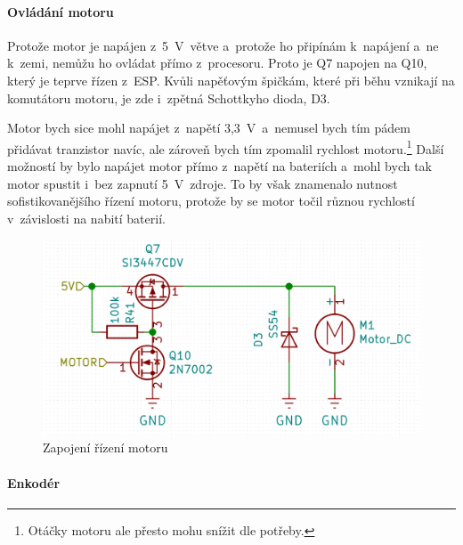 \paragraph{Ovládání motoru}
Protože motor je napájen z~5~V~větve a~protože ho připínám k~napájení a~ne k~zemi, nemůžu ho ovládat přímo z~procesoru. Proto je Q7 napojen na Q10, který je teprve řízen z~ESP. 
Kvůli napěťovým špičkám, které při běhu vznikají na komutátoru motoru, je zde i~zpětná Schottkyho dioda, D3.

Motor bych sice mohl napájet z~napětí 3,3~V~a~nemusel bych tím pádem přidávat tranzistor navíc, ale zároveň bych tím zpomalil rychlost motoru.\footnote{Otáčky motoru ale přesto mohu snížit dle potřeby.}
Další možností by bylo napájet motor přímo z~napětí na bateriích a~mohl bych tak motor spustit i~bez zapnutí 5~V~zdroje. To by však znamenalo nutnost 
sofistikovanějšího řízení motoru, protože by se motor točil různou rychlostí v~závislosti na nabití baterií.

\begin{figure}[htbp]
    \centering
    \includegraphics[width=\textwidth]{kapitoly/obrazky/E4/ir_motor_enkoder/ovladani_motoru.png}
    \caption{Zapojení řízení motoru}
    \label{fig:E4-motor}
\end{figure}

\paragraph{Enkodér}
\label{IR}

